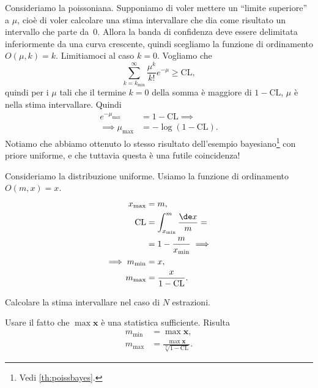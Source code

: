 \begin{example}
	Consideriamo la poissoniana.
	Supponiamo di voler mettere un ``limite superiore'' a $\mu$,
	cioè di voler calcolare una stima intervallare che dia come risultato un intervallo che parte da~0.
	Allora la banda di confidenza deve essere delimitata inferiormente da una curva crescente,
	quindi scegliamo la funzione di ordinamento $O(\mu,k)=k$.
	Limitiamoci al caso $k=0$.
	Vogliamo che
	\begin{equation*}
		\sum_{k=k_\mathrm{min}}^\infty \frac{\mu^k}{k!}e^{-\mu} \ge \mathrm{CL},
	\end{equation*}
	quindi per i $\mu$ tali che il termine $k=0$ della somma è maggiore di $1-\mathrm{CL}$,
	$\mu$ è nella stima intervallare.
	Quindi
	\begin{align*}
		e^{-\mu_\mathrm{max}}
		&= 1 - \mathrm{CL} \implies \\
		\implies \mu_\mathrm{\max}
		&= -\log(1-\mathrm{CL}).
	\end{align*}
	Notiamo che abbiamo ottenuto lo stesso risultato dell'esempio bayesiano\footnote{Vedi \autoref{th:poissbayes}.} con priore uniforme,
	e che tuttavia questa è una futile coincidenza!
\end{example}

\begin{example}
	Consideriamo la distribuzione uniforme.
	Usiamo la funzione di ordinamento $O(m,x)=x$.
	\begin{align*}
		x_\mathrm{max}
		&= m, \\
		\mathrm{CL}
		&= \int_{x_\mathrm{min}}^m \frac{\de x}{m} = \\
		&= 1 - \frac m{x_\mathrm{min}} \implies \\
		\implies m_\mathrm{min}
		&= x, \\
		m_\mathrm{max}
		&= \frac x{1-\mathrm{CL}}.
	\end{align*}
\end{example}

\begin{exercise}
	Calcolare la stima intervallare nel caso di $N$ estrazioni.
\end{exercise}

\begin{solution}
	Usare il fatto che $\max \mathbf x$ è una statistica sufficiente.
	Risulta
	\begin{align*}
		m_\mathrm{min}
		&= \max\mathbf x, \\
		m_\mathrm{max}
		&= \frac{\max\mathbf x}{\sqrt[N]{1-\mathrm{CL}}}.
	\end{align*}
\end{solution}

